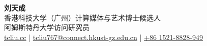 \documentclass[UTF8,a4paper,11pt,fontset=none]{ctexart}
\begin{document}
\pagestyle{fancy}
\renewcommand{\headrulewidth}{0pt}
\fancyhead{}
\thispagestyle{empty}

\begin{flushleft}
\textbf{\LARGE 刘天成}\\[2pt]
香港科技大学（广州）计算媒体与艺术博士候选人\\
阿姆斯特丹大学访问研究员\\
\href{https://tcliu.cc}{tcliu.cc} |
\href{mailto:tcliu767@connect.hkust-gz.edu.cn}{tcliu767@connect.hkust-gz.edu.cn} |
\href{tel:15218828949}{+86 1521-8828-949}
\end{flushleft}











\end{document}
